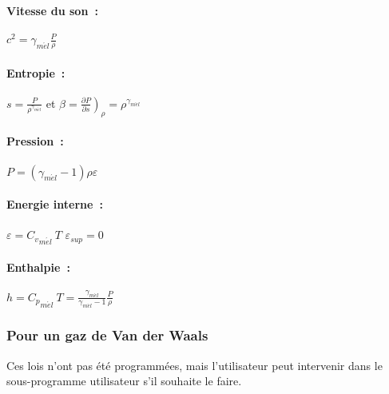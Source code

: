 \paragraph{Vitesse du son~:}

$c^2 = \gamma_{m\acute el} \displaystyle\frac{P}{\rho}$


\paragraph{Entropie~:}

$s = \displaystyle\frac{P}{\rho^{\gamma_{m\acute el}}}$
\quad et
$\beta = \left.\displaystyle\frac{\partial P}{\partial s}\right)_{\rho}
= \rho^{\gamma_{m\acute el}}$


\paragraph{Pression~:}

$P = (\gamma_{m\acute el}-1) \rho \varepsilon$


\paragraph{Energie interne~:}

$\varepsilon = {C_v}_{m\acute el}\ T$\qquad{}
$\varepsilon_{sup} = 0$


\paragraph{Enthalpie~:}

$h = {C_p}_{m\acute el}\  T
= \displaystyle\frac{\gamma_{m\acute el}}{\gamma_{m\acute el}-1}
\displaystyle\frac{P}{\rho}$

\subsubsection*{Pour un gaz de Van der Waals}

Ces lois n'ont pas été programmées, mais l'utilisateur peut intervenir
dans le sous-programme utilisateur  s'il souhaite le faire.


